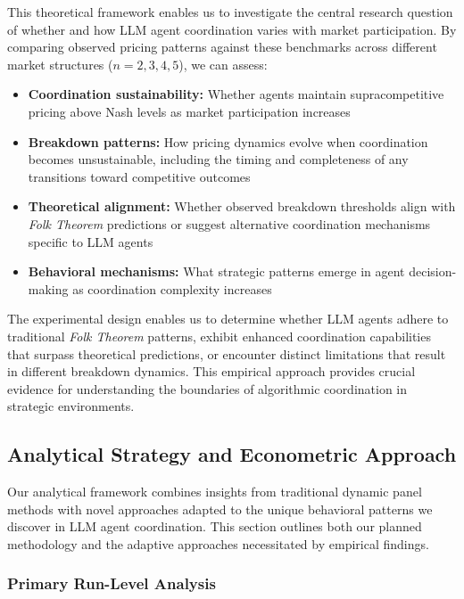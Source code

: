 This theoretical framework enables us to investigate the central research question of whether and how LLM agent coordination varies with market participation. By comparing observed pricing patterns against these benchmarks across different market structures ($n = 2, 3, 4, 5$), we can assess:
\begin{itemize}[noitemsep]
    \item \textbf{Coordination sustainability:} Whether agents maintain supracompetitive pricing above Nash levels as market participation increases
    \item \textbf{Breakdown patterns:} How pricing dynamics evolve when coordination becomes unsustainable, including the timing and completeness of any transitions toward competitive outcomes  
    \item \textbf{Theoretical alignment:} Whether observed breakdown thresholds align with \emph{Folk Theorem} predictions or suggest alternative coordination mechanisms specific to LLM agents
    \item \textbf{Behavioral mechanisms:} What strategic patterns emerge in agent decision-making as coordination complexity increases
\end{itemize}

The experimental design enables us to determine whether LLM agents adhere to traditional \emph{Folk Theorem} patterns, exhibit enhanced coordination capabilities that surpass theoretical predictions, or encounter distinct limitations that result in different breakdown dynamics. This empirical approach provides crucial evidence for understanding the boundaries of algorithmic coordination in strategic environments.

\subsection{Analytical Strategy and Econometric Approach}

Our analytical framework combines insights from traditional dynamic panel methods with novel approaches adapted to the unique behavioral patterns we discover in LLM agent coordination. This section outlines both our planned methodology and the adaptive approaches necessitated by empirical findings.

\subsubsection*{Primary Run-Level Analysis}

